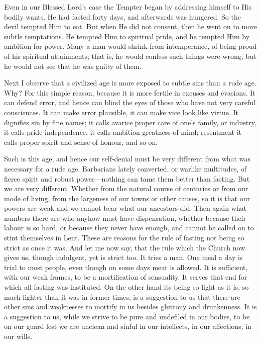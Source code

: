 Even in our Blessed Lord's case the Tempter began
by addressing himself to His bodily wants. He had fasted forty days,
and afterwards was hungered. So the devil tempted Him to eat. But when
He did not consent, then he went on to more subtle temptations. He
tempted Him to spiritual pride, and he tempted Him by ambition for
power. Many a man would shrink from intemperance, of being proud
of his spiritual attainments; that is, he would confess such things
were wrong, but he would not see that he was guilty of them.

Next I observe that a civilized age is more
exposed to subtle sins than a rude age. Why? For this simple reason,
because it is more fertile in excuses and evasions. It can defend
error, and hence can blind the eyes of those who have not very careful
consciences. It can make error plausible, it can make vice look like
virtue. It dignifies sin by fine names; it calls avarice proper care
of one's family, or industry, it calls pride independence, it calls
ambition greatness of mind; resentment it calls proper spirit and
sense of honour, and so on.

Such is this age, and hence our self-denial must
be very different from what was necessary for a rude age. Barbarians
lately converted, or warlike multitudes, of fierce spirit and robust
power—nothing can tame them better than fasting. But we are very
different. Whether from the natural course of centuries or from our
mode of living, from the largeness of our towns or other causes, so it
is that our powers are weak and we cannot bear what our ancestors did.
Then again what numbers there are who anyhow must have dispensation,
whether because their labour is so hard, or because they never have
enough, and cannot be called on to stint themselves in Lent. These are
reasons for the rule of fasting not being so strict as once it was.
And let me now say, that the rule which the Church now gives us,
though indulgent, yet is strict too. It tries a man. One meal a day is
trial to most people, even though on some days meat is allowed. It is
sufficient, with our weak frames, to be a mortification of sensuality.
It serves that end for which all fasting was instituted. On the other
hand its being so light as it is, so much lighter than it was in
former times, is a suggestion to us that there are other sins and
weaknesses to mortify in us besides gluttony and drunkenness. It is a
suggestion to us, while we strive to be pure and undefiled in our
bodies, to be on our guard lest we are unclean and sinful in our
intellects, in our affections, in our wills.

